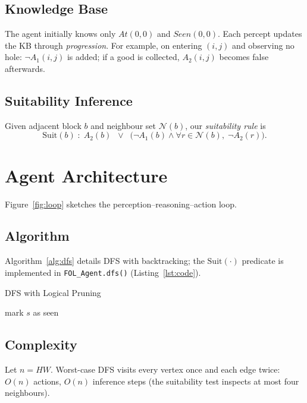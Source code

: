 \documentclass[12pt]{article}
\begin{document}
\subsection{Knowledge Base}
The agent initially knows only \(At(0,0)\) and \(Seen(0,0)\).
Each percept updates the KB through \emph{progression}.  
For example, on entering $(i,j)$ and observing no hole:
\(\neg A_1(i,j)\) is added; if a good is collected,
\(A_2(i,j)\) becomes false afterwards.

\subsection{Suitability Inference}
Given adjacent block $b$ and neighbour set $\mathcal{N}(b)$, our
\emph{suitability rule} is
\begin{equation}
    \mathrm{Suit}(b) \;:\; A_2(b)
    \;\;\lor\;\;
    \bigl(\neg A_1(b) \land \forall r\!\in\!\mathcal{N}(b),\; \neg A_2(r)\bigr).
    \label{eq:suitability}
\end{equation}

\section{Agent Architecture}\label{sec:agent}
Figure~\ref{fig:loop} sketches the perception–reasoning–action loop.


\subsection{Algorithm}
Algorithm~\ref{alg:dfs} details DFS with backtracking; the
\(\mathrm{Suit}(\cdot)\) predicate is implemented in
\texttt{FOL\_Agent.dfs()} (Listing~\ref{lst:code}).

\begin{algorithm}[ht]
\caption{DFS with Logical Pruning}\label{alg:dfs}
\begin{algorithmic}[1]
    \State mark $s$ as seen
            \State {}
             \Return
            \EndIf
            \State {}
            \State {}
        \EndIf
    \EndFor
\EndProcedure
\end{algorithmic}
\end{algorithm}

\subsection{Complexity}
Let $n{=}HW$.  
Worst-case DFS visits every vertex once and each edge twice:
\(O(n)\) actions, \(O(n)\) inference steps
(the suitability test inspects at most four neighbours).
\end{document}
